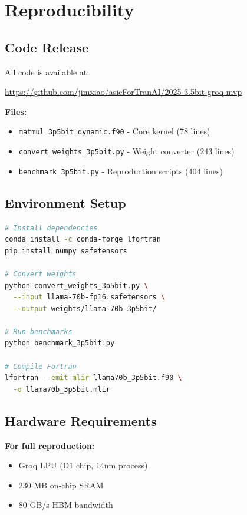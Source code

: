 \documentclass[10pt]{article}
\begin{document}
\section{Reproducibility}

\subsection{Code Release}

All code is available at:
\begin{center}
\url{https://github.com/jimxiao/asicForTranAI/2025-3.5bit-groq-mvp}
\end{center}

\textbf{Files:}
\begin{itemize}
\item \texttt{matmul\_3p5bit\_dynamic.f90} - Core kernel (78 lines)
\item \texttt{convert\_weights\_3p5bit.py} - Weight converter (243 lines)
\item \texttt{benchmark\_3p5bit.py} - Reproduction scripts (404 lines)
\end{itemize}

\subsection{Environment Setup}

\begin{lstlisting}[language=bash]
# Install dependencies
conda install -c conda-forge lfortran
pip install numpy safetensors

# Convert weights
python convert_weights_3p5bit.py \
  --input llama-70b-fp16.safetensors \
  --output weights/llama-70b-3p5bit/

# Run benchmarks
python benchmark_3p5bit.py

# Compile Fortran
lfortran --emit-mlir llama70b_3p5bit.f90 \
  -o llama70b_3p5bit.mlir
\end{lstlisting}

\subsection{Hardware Requirements}

\textbf{For full reproduction:}
\begin{itemize}
\item Groq LPU (D1 chip, 14nm process)
\item 230 MB on-chip SRAM
\item 80 GB/s HBM bandwidth
\end{itemize}
\end{document}
